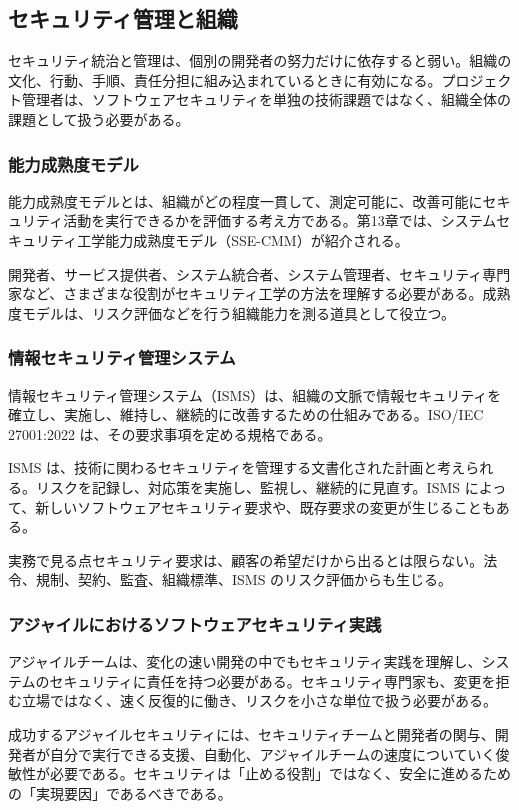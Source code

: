 \subsection{セキュリティ管理と組織}
セキュリティ統治と管理は、個別の開発者の努力だけに依存すると弱い。組織の文化、行動、手順、責任分担に組み込まれているときに有効になる。プロジェクト管理者は、ソフトウェアセキュリティを単独の技術課題ではなく、組織全体の課題として扱う必要がある。

\subsubsection{能力成熟度モデル}
能力成熟度モデルとは、組織がどの程度一貫して、測定可能に、改善可能にセキュリティ活動を実行できるかを評価する考え方である。第13章では、システムセキュリティ工学能力成熟度モデル（SSE-CMM）が紹介される。

開発者、サービス提供者、システム統合者、システム管理者、セキュリティ専門家など、さまざまな役割がセキュリティ工学の方法を理解する必要がある。成熟度モデルは、リスク評価などを行う組織能力を測る道具として役立つ。

\subsubsection{情報セキュリティ管理システム}
情報セキュリティ管理システム（ISMS）は、組織の文脈で情報セキュリティを確立し、実施し、維持し、継続的に改善するための仕組みである。ISO/IEC 27001:2022 は、その要求事項を定める規格である。

ISMS は、技術に関わるセキュリティを管理する文書化された計画と考えられる。リスクを記録し、対応策を実施し、監視し、継続的に見直す。ISMS によって、新しいソフトウェアセキュリティ要求や、既存要求の変更が生じることもある。

\begin{notebox}{実務で見る点}セキュリティ要求は、顧客の希望だけから出るとは限らない。法令、規制、契約、監査、組織標準、ISMS のリスク評価からも生じる。\end{notebox}
\subsubsection{アジャイルにおけるソフトウェアセキュリティ実践}
アジャイルチームは、変化の速い開発の中でもセキュリティ実践を理解し、システムのセキュリティに責任を持つ必要がある。セキュリティ専門家も、変更を拒む立場ではなく、速く反復的に働き、リスクを小さな単位で扱う必要がある。

成功するアジャイルセキュリティには、セキュリティチームと開発者の関与、開発者が自分で実行できる支援、自動化、アジャイルチームの速度についていく俊敏性が必要である。セキュリティは「止める役割」ではなく、安全に進めるための「実現要因」であるべきである。
